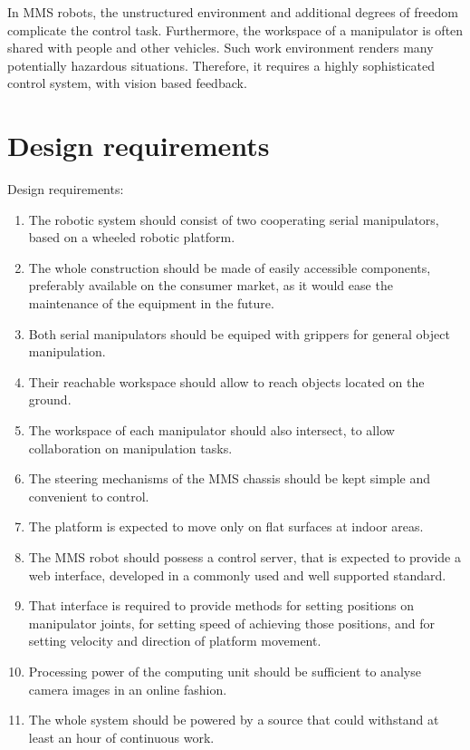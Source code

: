 In MMS robots, the unstructured environment and additional degrees of freedom complicate the control task. Furthermore, the workspace of a manipulator is often shared with people and other vehicles. Such work environment renders many potentially hazardous situations. Therefore, it requires a highly sophisticated control system, with vision based feedback. 


\section{Design requirements}
\label{sec:require}

Design requirements:
\begin{enumerate}
\item The robotic system should consist of two cooperating serial manipulators, based on a wheeled robotic platform.
\item The whole construction should be made of easily accessible components, preferably available on the consumer market, as it would ease the maintenance of the equipment in the future.
\item Both serial manipulators should be equiped with grippers for general object manipulation.
\item Their reachable workspace should allow to reach objects located on the ground.
\item The workspace of each manipulator should also intersect, to allow collaboration on manipulation tasks.
\item The steering mechanisms of the MMS chassis should be kept simple and convenient to control.
\item The platform is expected to move only on flat surfaces at indoor areas.
\item The MMS robot should possess a control server, that is expected to provide a web interface, developed in a commonly used and well supported standard.
\item That interface is required to provide methods for setting positions on manipulator joints, for setting speed of achieving those positions, and for setting velocity and direction of platform movement. 
\item Processing power of the computing unit should be sufficient to analyse camera images in an online fashion. 
\item The whole system should be powered by a source that could withstand at least an hour of continuous work.
\end{enumerate}


